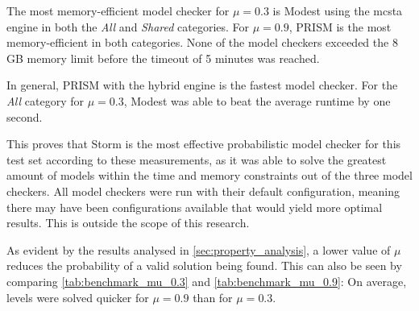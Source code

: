 The most memory-efficient model checker for $\mu=0.3$ is Modest using the mcsta engine in both the \textit{All} and \textit{Shared} categories. For $\mu=0.9$, PRISM is the most memory-efficient in both categories. None of the model checkers exceeded the 8 GB memory limit before the timeout of 5 minutes was reached.

In general, PRISM with the hybrid engine is the fastest model checker. For the \textit{All} category for $\mu=0.3$, Modest was able to beat the average runtime by one second.

This proves that Storm is the most effective probabilistic model checker for this test set according to these measurements, as it was able to solve the greatest amount of models within the time and memory constraints out of the three model checkers. All model checkers were run with their default configuration, meaning there may have been configurations available that would yield more optimal results. This is outside the scope of this research.

As evident by the results analysed in \autoref{sec:property_analysis}, a lower value of $\mu$ reduces the probability of a valid solution being found. This can also be seen by comparing \autoref{tab:benchmark_mu_0.3} and \autoref{tab:benchmark_mu_0.9}: On average, levels were solved quicker for $\mu=0.9$ than for $\mu=0.3$.